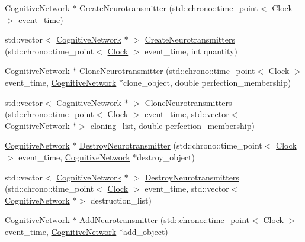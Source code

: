 \begin{DoxyCompactItemize}
\hyperlink{class_cognitive_network}{Cognitive\+Network} $\ast$ \hyperlink{class_membrane_channel_aa8e78a1b0dd7c6b81cac09d33f01e6c2}{Create\+Neurotransmitter} (std\+::chrono\+::time\+\_\+point$<$ \hyperlink{universe_8h_a0ef8d951d1ca5ab3cfaf7ab4c7a6fd80}{Clock} $>$ event\+\_\+time)
\item 
std\+::vector$<$ \hyperlink{class_cognitive_network}{Cognitive\+Network} $\ast$ $>$ \hyperlink{class_membrane_channel_a24c791e6cfd906d49e0ceb8a24eeb4cb}{Create\+Neurotransmitters} (std\+::chrono\+::time\+\_\+point$<$ \hyperlink{universe_8h_a0ef8d951d1ca5ab3cfaf7ab4c7a6fd80}{Clock} $>$ event\+\_\+time, int quantity)
\item 
\hyperlink{class_cognitive_network}{Cognitive\+Network} $\ast$ \hyperlink{class_membrane_channel_af667720bd2214ea3a1e6d272b57d3a79}{Clone\+Neurotransmitter} (std\+::chrono\+::time\+\_\+point$<$ \hyperlink{universe_8h_a0ef8d951d1ca5ab3cfaf7ab4c7a6fd80}{Clock} $>$ event\+\_\+time, \hyperlink{class_cognitive_network}{Cognitive\+Network} $\ast$clone\+\_\+object, double perfection\+\_\+membership)
\item 
std\+::vector$<$ \hyperlink{class_cognitive_network}{Cognitive\+Network} $\ast$ $>$ \hyperlink{class_membrane_channel_a6426185a0d73c967adcb72e3a22b48b0}{Clone\+Neurotransmitters} (std\+::chrono\+::time\+\_\+point$<$ \hyperlink{universe_8h_a0ef8d951d1ca5ab3cfaf7ab4c7a6fd80}{Clock} $>$ event\+\_\+time, std\+::vector$<$ \hyperlink{class_cognitive_network}{Cognitive\+Network} $\ast$$>$ cloning\+\_\+list, double perfection\+\_\+membership)
\item 
\hyperlink{class_cognitive_network}{Cognitive\+Network} $\ast$ \hyperlink{class_membrane_channel_a985d8f93077b0f93daa9c311a22917a1}{Destroy\+Neurotransmitter} (std\+::chrono\+::time\+\_\+point$<$ \hyperlink{universe_8h_a0ef8d951d1ca5ab3cfaf7ab4c7a6fd80}{Clock} $>$ event\+\_\+time, \hyperlink{class_cognitive_network}{Cognitive\+Network} $\ast$destroy\+\_\+object)
\item 
std\+::vector$<$ \hyperlink{class_cognitive_network}{Cognitive\+Network} $\ast$ $>$ \hyperlink{class_membrane_channel_ad5dfc13b89aff0c7383e052113da1d8f}{Destroy\+Neurotransmitters} (std\+::chrono\+::time\+\_\+point$<$ \hyperlink{universe_8h_a0ef8d951d1ca5ab3cfaf7ab4c7a6fd80}{Clock} $>$ event\+\_\+time, std\+::vector$<$ \hyperlink{class_cognitive_network}{Cognitive\+Network} $\ast$$>$ destruction\+\_\+list)
\item 
\hyperlink{class_cognitive_network}{Cognitive\+Network} $\ast$ \hyperlink{class_membrane_channel_ae483c6bc45f73390070b824296762d4c}{Add\+Neurotransmitter} (std\+::chrono\+::time\+\_\+point$<$ \hyperlink{universe_8h_a0ef8d951d1ca5ab3cfaf7ab4c7a6fd80}{Clock} $>$ event\+\_\+time, \hyperlink{class_cognitive_network}{Cognitive\+Network} $\ast$add\+\_\+object)

\end{DoxyCompactItemize}
